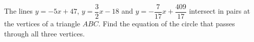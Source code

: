 The lines $y=-5x+47$, $y=\dfrac{3}{2}x-18$ and $y=-\dfrac{7}{17}x+\dfrac{409}{17}$ intersect in pairs at the vertices of a triangle $ABC$. Find the equation of the circle that passes through all three vertices.
